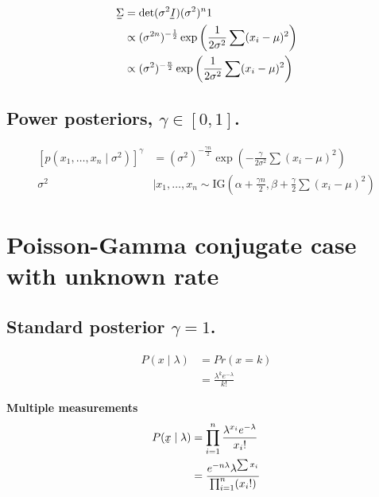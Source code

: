 \documentclass[12pt]{article}
\begin{document}
\begin{appendices}
\begin{equation*}
    \begin{aligned}
    \underaccent{=}\Sigma&=\det(\sigma^2\underaccent{=}I)(\sigma^2)^n1\\
    &\propto(\sigma^{2n})^{-\frac{1}{2}}\exp\left(\frac{1}{2\sigma^2}\sum(x_i-\mu)^2\right)\\
    &\propto(\sigma^{2})^{-\frac{n}{2}}\exp\left(\frac{1}{2\sigma^2}\sum(x_i-\mu)^2\right)
 \end{aligned}
\end{equation*}

\subsection{Power posteriors, $\gamma \in [0,1]$.}
\begin{equation}
    \begin{aligned}
        [p(x_1, \ldots, x_n \mid \sigma^2)]^\gamma &=(\sigma^{2})^{-\frac{\gamma n}{2}}\exp\left(-\frac{\gamma}{2\sigma^2}\sum(x_i-\mu)^2\right)\\
        \sigma^2 &| x_1, \ldots, x_n \sim \text{IG}\left(\alpha+ \frac{\gamma n}{2}, \beta+\frac{\gamma}{2}\sum(x_i -\mu)^2\right)
    \end{aligned}
\end{equation}
\end{appendices}
\section{Poisson-Gamma conjugate case with unknown rate}
\subsection{Standard posterior $\gamma=1$.}
\begin{equation*}
    \begin{aligned}
        P(x \mid \lambda) &= Pr(x=k)\\
 &=\frac{\lambda^ke^{-\lambda}}{k!}
    \end{aligned}
\end{equation*}

\textbf{Multiple measurements}
\begin{equation*}
    \begin{aligned}
        P(\underaccent{\tilde}x \mid \lambda) &= \prod_{i=1}^n \frac{\lambda^{x_i} e^{-\lambda}}{x_i!}\\
        &= \frac{e^{-n \lambda}\lambda^{\sum x_i}}{\prod_{i=1}^n (x_i!)}
    \end{aligned}
\end{equation*}
\end{document}
